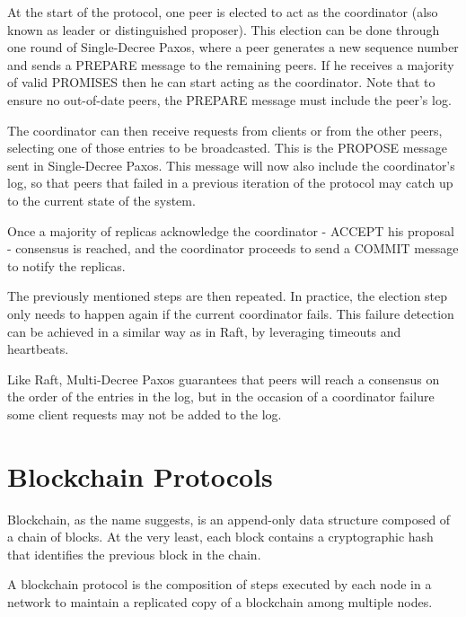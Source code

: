 At the start of the protocol, one peer is elected to act as the coordinator (also known as leader or distinguished proposer). This election can be done through one round of Single-Decree Paxos, where a peer generates a new sequence number and sends a PREPARE message to the remaining peers. If he receives a majority of valid PROMISES then he can start acting as the coordinator. Note that to ensure no out-of-date peers, the PREPARE message must include the peer’s log.

The coordinator can then receive requests from clients or from the other peers, selecting one of those entries to be broadcasted. This is the PROPOSE message sent in Single-Decree Paxos. This message will now also include the coordinator’s log, so that peers that failed in a previous iteration of the protocol may catch up to the current state of the system.

Once a majority of replicas acknowledge the coordinator - ACCEPT his proposal - consensus is reached, and the coordinator proceeds to send a COMMIT message to notify the replicas.

\vspace{0.5cm}

The previously mentioned steps are then repeated. In practice, the election step only needs to happen again if the current coordinator fails. This failure detection can be achieved in a similar way as in Raft, by leveraging timeouts and heartbeats.

\vspace{0.5cm}

Like Raft, Multi-Decree Paxos guarantees that peers will reach a consensus on the order of the entries in the log, but in the occasion of a coordinator failure some client requests may not be added to the log.




\section{Blockchain Protocols}

Blockchain, as the name suggests, is an append-only data structure composed of a chain of blocks. At the very least, each block contains a cryptographic hash that identifies the previous block in the chain.

\vspace{0.5cm}

A blockchain protocol is the composition of steps executed by each node in a network to maintain a replicated copy of a blockchain among multiple nodes. 

